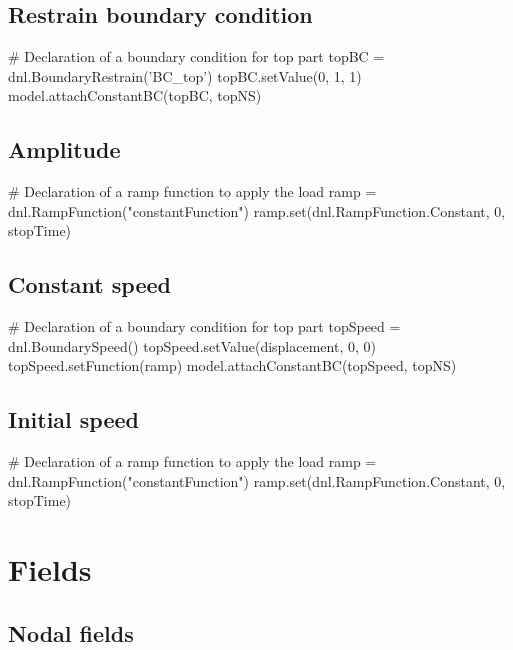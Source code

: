 \subsection{Restrain boundary condition}

\begin{PythonListing}
# Declaration of a boundary condition for top part
topBC = dnl.BoundaryRestrain('BC_top')
topBC.setValue(0, 1, 1)
model.attachConstantBC(topBC, topNS)
\end{PythonListing}

\subsection{Amplitude}

\begin{PythonListing}
# Declaration of a ramp function to apply the load
ramp = dnl.RampFunction("constantFunction")
ramp.set(dnl.RampFunction.Constant, 0, stopTime)
\end{PythonListing}

\subsection{Constant speed}

\begin{PythonListing}
# Declaration of a boundary condition for top part
topSpeed = dnl.BoundarySpeed()
topSpeed.setValue(displacement, 0, 0)
topSpeed.setFunction(ramp)
model.attachConstantBC(topSpeed, topNS)
\end{PythonListing}

\subsection{Initial speed}

\begin{PythonListing}
# Declaration of a ramp function to apply the load
ramp = dnl.RampFunction("constantFunction")
ramp.set(dnl.RampFunction.Constant, 0, stopTime)
\end{PythonListing}

\section{Fields}

\subsection{Nodal fields}

